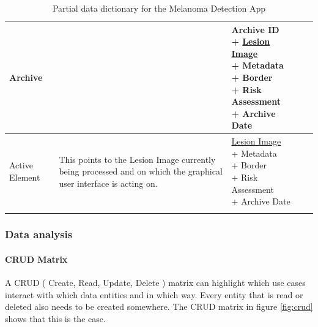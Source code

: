 {\begin{longtable}[H]{ | p{2.5cm} | p{2.5cm} | p{2.5cm} | p{1.0cm} | p{2.5cm} | }
                    Archive &  &

                        \specialcell[t]{Archive ID
                            \\ + \hyperlink{lesion_image}{Lesion Image}
                            \\ + Metadata
                            \\ + Border
                            \\ + Risk Assessment
                            \\ + Archive Date
                        }

                     & & \\ \hline

                    Active Element & This points to the Lesion Image currently being processed and on which the graphical user interface is acting on. &

                        \specialcell[t]{\hyperlink{lesion_image}{Lesion Image}
                            \\ + Metadata
                            \\ + Border
                            \\ + Risk Assessment
                            \\ + Archive Date
                        }

                     & & \\ \hline
                    \caption{Partial data dictionary for the Melanoma Detection App}
                    \label{fig:data_dictionary}
                \end{longtable}}


        \subsubsection{Data analysis}
            \paragraph{CRUD Matrix}

                A CRUD ( Create, Read, Update, Delete ) matrix can highlight which use cases interact with which data entities and in which way. Every entity that is read or deleted also needs to be created somewhere. The CRUD matrix in figure \ref{fig:crud} shows that this is the case.

